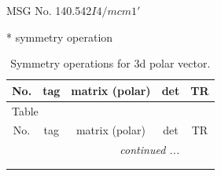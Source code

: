 \documentclass[fleqn,8pt]{jsarticle}
\begin{document}
\setcounter{MaxMatrixCols}{32}

\renewcommand{\tablename}{Table~}
\renewcommand{\figurename}{Figure~}
\begin{center}
\LARGE
MSG No. 140.542\quad$I4/mcm1'$
\end{center}
* symmetry operation
\renewcommand{\arraystretch}{1.3}
\begin{longtable}{ccccc}
\caption{Symmetry operations for 3d polar vector.}
 \\
 \hline \hline
No. & tag & matrix (polar) & det & TR \\ \hline \endfirsthead

\multicolumn{4}{l}{\tablename\ \thetable{}} \\
 \hline \hline
No. & tag & matrix (polar) & det & TR \\ \hline \endhead

 \hline \hline
\multicolumn{4}{r}{\footnotesize\it continued ...} \\ \endfoot

 \hline \hline
\multicolumn{4}{r}{} \\ \endlastfoot


\end{longtable}
\end{document}
